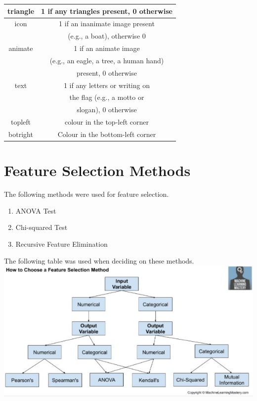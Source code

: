 \documentclass[conference]{IEEEtran}
\begin{document}
\begin{table}[htbp]
\begin{center}
\begin{tabular}{ |c|c| } 
 \hline
 triangle & 1 if any triangles present, 0 otherwise\\
 \hline
 icon & 1 if an inanimate image present \\& (e.g., a boat), otherwise 0\\
 \hline
 animate & 1 if an animate image \\& (e.g., an eagle, a tree, a human hand)\\& present, 0 otherwise\\
 \hline
 text & 1 if any letters or writing on \\& the flag (e.g., a motto or\\& slogan), 0 otherwise\\
 \hline
 topleft & colour in the top-left corner\\
 \hline
 botright & Colour in the bottom-left corner\\
 \hline
\end{tabular}
\end{center}
\end{table}

\section{Feature Selection Methods}
The following methods were used for feature selection.
\renewcommand{\theenumi}{\alph{enumi}}
\begin{enumerate}
    \item ANOVA Test
    \item Chi-squared Test
    \item Recursive Feature Elimination
\end{enumerate}
The following table was used when deciding on these methods.
\includegraphics[scale=0.5]{featureselection.jpg}\cite{b2}
\end{document}
